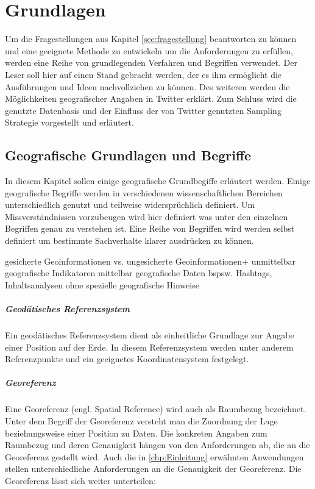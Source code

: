 \chapter{Grundlagen} 
Um die Fragestellungen aus Kapitel \ref{sec:fragestellung} beantworten zu können und eine geeignete Methode zu entwickeln um die Anforderungen zu erfüllen, werden eine Reihe von grundlegenden Verfahren und Begriffen verwendet. 
Der Leser soll hier auf einen Stand gebracht werden, der es ihm ermöglicht die Ausführungen und Ideen nachvollziehen zu können.  
Des weiteren werden die Möglichkeiten geografischer Angaben in Twitter erklärt.
Zum Schluss wird die genutzte Datenbasis und der Einfluss der von Twitter genutzten Sampling Strategie vorgestellt und erläutert.

\newpage

	\section{Geografische Grundlagen und Begriffe}
	In diesem Kapitel sollen einige geografische Grundbegiffe erläutert werden. 
	Einige geografische Begriffe werden in verschiedenen wissenschaftlichen Bereichen unterschiedlich genutzt und teilweise widersprüchlich definiert. 
	Um Missverständnissen vorzubeugen wird hier definiert was unter den einzelnen Begriffen genau zu verstehen ist.
	Eine Reihe von Begriffen wird werden selbst definiert um bestimmte Sachverhalte klarer ausdrücken zu können. 

	gesicherte Geoinformationen vs. ungesicherte Geoinformationen+
	unmittelbar geografische Indikatoren
	mittelbar geografische Daten bspsw. Hashtags, Inhaltsanalysen ohne spezielle geografische Hinweise

		\paragraph*{Geodätisches Referenzsystem} 
		Ein geodätisches Referenzsystem dient als einheitliche Grundlage zur Angabe einer Position auf der Erde. 
		In diesem Referenzsystem werden unter anderem Referenzpunkte und ein geeignetes Koordinatensystem festgelegt.  
		
		\paragraph{Georeferenz}
		Eine Georeferenz (engl. Spatial Reference) wird auch als Raumbezug bezeichnet. 
		Unter dem Begriff der Georeferenz versteht man die Zuordnung der Lage beziehungsweise einer Position zu Daten. 
		Die konkreten Angaben zum Raumbezug und deren Genauigkeit hängen von den Anforderungen ab, die an die Georeferenz gestellt wird. 
		Auch die in \ref{chp:Einleitung} erwähnten Anwendungen stellen unterschiedliche Anforderungen an die Genauigkeit der Georeferenz.
		Die Georeferenz lässt sich weiter unterteilen:
		
